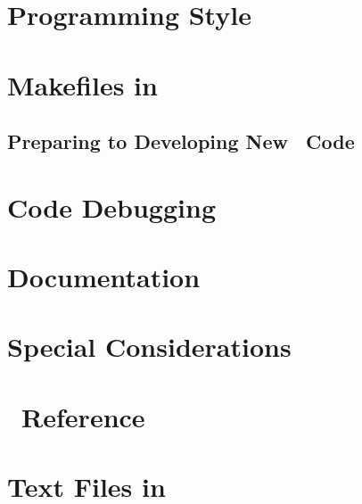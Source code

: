 \documentclass[12pt]{article}
\begin{document}
\section{Programming Style}\label{Style}


\section{Makefiles in \PSIthree}\label{Makefiles}


\subsection{Preparing to Developing New \PSIthree\ Code}\label{New_Code}


\section{Code Debugging}\label{Debugging}


\section{Documentation}\label{Documentation}


\section{Special Considerations}\label{Special_Considerations}


\newpage
\appendix

%

\section{\PSIthree\ Reference}\label{PSI_Reference}


\section{Text Files in \PSIthree}\label{Text_files}


%
\end{document}
